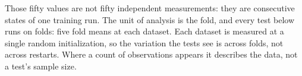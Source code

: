 Those fifty values are not fifty independent measurements: they are consecutive states of one
training run.
The unit of analysis is the fold, and every test below runs on folds: five fold means at each
dataset.
Each dataset is measured at a single random initialization, so the variation the tests see is
across folds, not across restarts. Where a count of observations appears it describes the data, not
a test's sample size.

